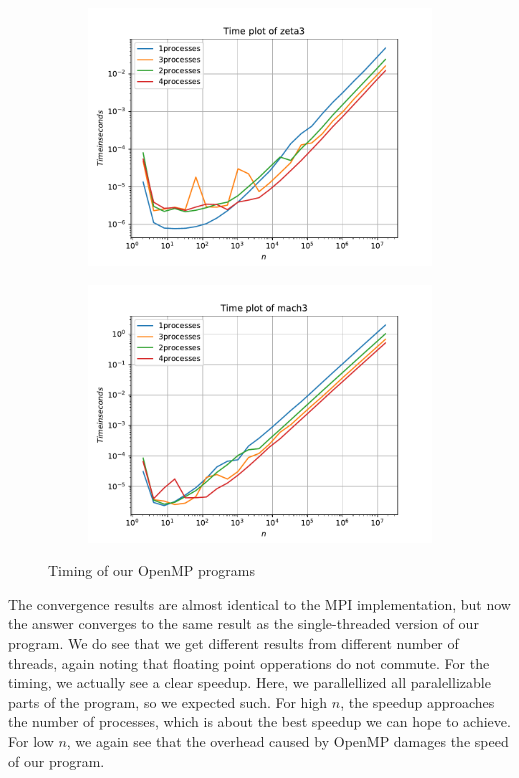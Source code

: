\documentclass[12pt]{article}
\begin{document}
\begin{figure}
    \centering
    \begin{subfigure}[!htb]{0.45\textwidth}
        \includegraphics[width=\textwidth]{zeta3Time}
    \end{subfigure}
    \begin{subfigure}[!htb]{0.45\textwidth}
        \includegraphics[width=\textwidth]{mach3Time}
    \end{subfigure}
    \caption{Timing of our OpenMP programs}\label{fig:Time3}
\end{figure}
The convergence results are almost identical to the MPI implementation, but now the answer converges to the same result as the single-threaded version of our program.
We do see that we get different results from different number of threads, again noting that floating point opperations do not commute.
For the timing, we actually see a clear speedup. Here, we parallellized all paralellizable parts of the program, so we expected such. For high $n$, the speedup approaches the number of
processes, which is about the best speedup we can hope to achieve. For low $n$, we again see that the overhead caused by OpenMP damages the speed of our program.
\end{document}
